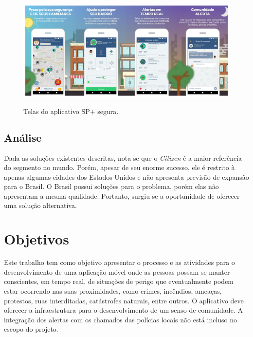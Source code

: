 \begin{figure}[htbp]
	\caption{\small Telas do aplicativo SP+ segura.}
	\centering
	\includegraphics[width=\textwidth]{./images/sp-mais-segura.png}
	\label{f.sp-mais-segura}
\end{figure}

\FloatBarrier

\subsection{Análise}

Dada as soluções existentes descritas, nota-se que o \emph{Citizen} é a maior referência do segmento no mundo. Porém, apesar de seu enorme sucesso, ele é restrito à apenas algumas cidades dos Estados Unidos e não apresenta previsão de expansão para o Brasil. O Brasil possui soluções para o problema, porém elas não apresentam a mesma qualidade. Portanto, surgiu-se a oportunidade de oferecer uma solução alternativa.

\section{Objetivos}



Este trabalho tem como objetivo apresentar o processo e as atividades para o desenvolvimento de uma aplicação móvel onde as pessoas possam se manter conscientes, em tempo real, de situações de perigo que eventualmente podem estar ocorrendo nas suas proximidades, como crimes, incêndios, ameaças, protestos, ruas interditadas, catástrofes naturais, entre outros. O aplicativo deve oferecer a infraestrutura para o desenvolvimento de um senso de comunidade. A integração dos alertas com os chamados das polícias locais não está incluso no escopo do projeto.
